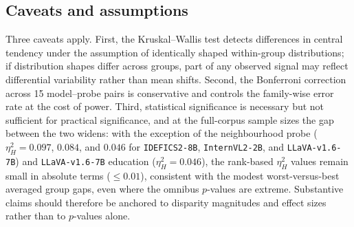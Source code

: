 \documentclass[letterpaper]{article} %
\newcommand{\model}[1]{\texttt{#1}}
\begin{document}
\subsection{Caveats and assumptions}
\label{app:stats_caveats}

Three caveats apply. First, the Kruskal--Wallis test detects differences in central tendency under the assumption of identically shaped within-group distributions; if distribution shapes differ across groups, part of any observed signal may reflect differential variability rather than mean shifts. Second, the Bonferroni correction across 15 model--probe pairs is conservative and controls the family-wise error rate at the cost of power. Third, statistical significance is necessary but not sufficient for practical significance, and at the full-corpus sample sizes the gap between the two widens: with the exception of the neighbourhood probe ($\eta^2_H = 0.097$, $0.084$, and $0.046$ for \model{IDEFICS2-8B}, \model{InternVL2-2B}, and \model{LLaVA-v1.6-7B}) and \model{LLaVA-v1.6-7B} education ($\eta^2_H = 0.046$), the rank-based $\eta^2_H$ values remain small in absolute terms ($\leq 0.01$), consistent with the modest worst-versus-best averaged group gaps, even where the omnibus $p$-values are extreme. Substantive claims should therefore be anchored to disparity magnitudes and effect sizes rather than to $p$-values alone.


\end{document}
